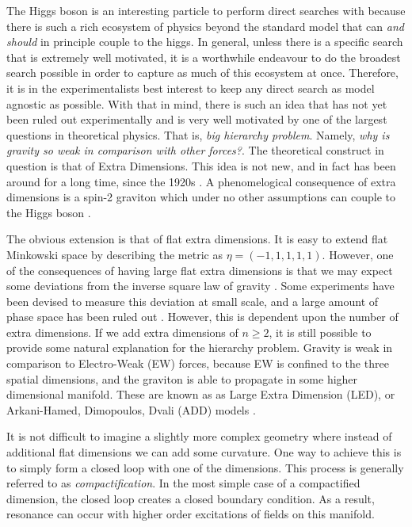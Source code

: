 \documentclass[12pt]{article}
\begin{document}
The Higgs boson is an interesting particle to perform direct searches with
because there is such a rich ecosystem of physics beyond the standard model that
can \textit{and should} in principle couple to the higgs. In general, unless
there is a specific search that is extremely well motivated, it is a worthwhile
endeavour to do the broadest search possible in order to capture as much of this
ecosystem at once. Therefore, it is in the experimentalists best interest to
keep any direct search as model agnostic as possible. With that in mind, there
is such an idea that has not yet been ruled out experimentally and is very well
motivated by one of the largest questions in theoretical physics. That is,
\textit{big hierarchy problem}. Namely, \textit{why is gravity so weak in
comparison with other forces?}. The theoretical construct in question is that of
Extra Dimensions. This idea is not new, and in fact has been around for a long
time, since the 1920s \cite{KALUZA_2018}. A phenomelogical consequence of extra
dimensions is a spin-2 graviton which under no other assumptions can couple to
the Higgs boson \cite{bsm}.  

The obvious extension is that of flat extra dimensions. It is easy to extend
flat Minkowski space by describing the metric as $\eta = (-1,1,1,1,1)$. However,
one of the consequences of having large flat extra dimensions is that we may
expect some deviations from the inverse square law of gravity \cite{bsm}. Some
experiments have been devised to measure this deviation at small scale, and a
large amount of phase space has been ruled out \cite{bsm}. However, this is
dependent upon the number of extra dimensions. If we add extra dimensions of
$n\geq 2$, it is still possible to provide some natural explanation for the
hierarchy problem. Gravity is weak in comparison to Electro-Weak (EW) forces,
because EW is confined to the three spatial dimensions, and the graviton is able
to propagate in some higher dimensional manifold. These are known as as Large
Extra Dimension (LED), or Arkani-Hamed, Dimopoulos, Dvali (ADD) models
\cite{Arkani_Hamed_1998, Arkani_Hamed_1999}. 

It is not difficult to imagine a slightly more complex geometry where instead of
additional flat dimensions we can add some curvature. One way to achieve this is
to simply form a closed loop with one of the dimensions. This process is
generally referred to as \textit{compactification}. In the most simple case of a
compactified dimension, the closed loop creates a closed boundary condition. As
a result, resonance can occur with higher order excitations of fields on this
manifold. 
\end{document}
